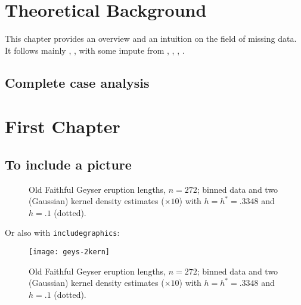 \chapter{Theoretical Background}

This chapter provides an overview and an intuition on the field of missing
data. It follows mainly \cite{schafer2002missing},
\cite{little2002statistical}, with some impute from
\cite{wikipediaImputation2015}, \cite{matloffblog2015}, \cite{gelman2006data},
\cite{troyanskaya2001missing}.

\section{Complete case analysis}
\label{sec:compl-case}


\chapter{First Chapter}

\section{To include a picture}
\begin{figure}[hbt!]%
  \caption[Geyser data: binned histogram, Silverman's and another
  kernel]%
  {Old Faithful Geyser eruption lengths, $n=272$; binned data and two
    (Gaussian) kernel density estimates ($\times 10$) with $h=h^*= .3348$
    and $h= .1$ (dotted).}%
  \label{fig:geys1}
\end{figure}

Or also with \texttt{includegraphics}:
\begin{figure}[hbt!]%
  \centering
  \texttt{[image: geys-2kern]} %
  \caption[Geyser data: binned histogram, Silverman's and another
  kernel]%
  {Old Faithful Geyser eruption lengths, $n=272$; binned data and two
    (Gaussian) kernel density estimates ($\times 10$) with $h=h^*= .3348$
    and $h= .1$ (dotted).}%
  \label{fig:geys2}
\end{figure}


